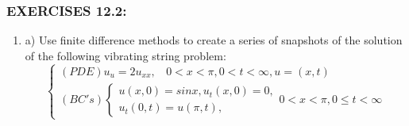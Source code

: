 \documentclass[../main.tex]{subfiles}
\begin{document}
{{\subsubsection{EXERCISES 12.2:}

\begin{enumerate}
 \item 
 		a) Use finite difference methods to create a series of snapshots of the solution of the following 
vibrating string problem:
$$	\begin{cases} 
	(PDE) u_u=2u_{xx},
	~~~~0<x<\pi, 0<t<\infty,u=(x,t)\\
(BC's)
		\begin{cases}
		u(x,0)=sin x, u_t(x,0)=0,\\
		u_t(0,t)=u(\pi ,t),
		\end{cases}
		0<x<\pi, 0\leqslant t< \infty 
	\end{cases}$$


\end{enumerate}}}
\end{document}
